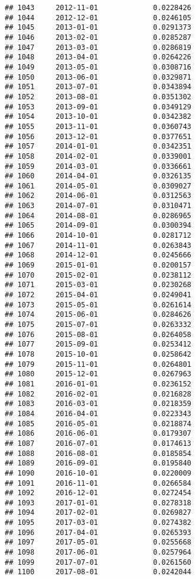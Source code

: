 \documentclass[
]{article}
\begin{document}
\begin{verbatim}
## 1043     2012-11-01             0.0228426
## 1044     2012-12-01             0.0246105
## 1045     2013-01-01             0.0291373
## 1046     2013-02-01             0.0285287
## 1047     2013-03-01             0.0286819
## 1048     2013-04-01             0.0264226
## 1049     2013-05-01             0.0308716
## 1050     2013-06-01             0.0329871
## 1051     2013-07-01             0.0343894
## 1052     2013-08-01             0.0351302
## 1053     2013-09-01             0.0349129
## 1054     2013-10-01             0.0342382
## 1055     2013-11-01             0.0360743
## 1056     2013-12-01             0.0377651
## 1057     2014-01-01             0.0342351
## 1058     2014-02-01             0.0339001
## 1059     2014-03-01             0.0336661
## 1060     2014-04-01             0.0326135
## 1061     2014-05-01             0.0309027
## 1062     2014-06-01             0.0312563
## 1063     2014-07-01             0.0310471
## 1064     2014-08-01             0.0286965
## 1065     2014-09-01             0.0300394
## 1066     2014-10-01             0.0281712
## 1067     2014-11-01             0.0263843
## 1068     2014-12-01             0.0245666
## 1069     2015-01-01             0.0200157
## 1070     2015-02-01             0.0238112
## 1071     2015-03-01             0.0230268
## 1072     2015-04-01             0.0249041
## 1073     2015-05-01             0.0261614
## 1074     2015-06-01             0.0284626
## 1075     2015-07-01             0.0263332
## 1076     2015-08-01             0.0264058
## 1077     2015-09-01             0.0253412
## 1078     2015-10-01             0.0258642
## 1079     2015-11-01             0.0264801
## 1080     2015-12-01             0.0267963
## 1081     2016-01-01             0.0236152
## 1082     2016-02-01             0.0216828
## 1083     2016-03-01             0.0218359
## 1084     2016-04-01             0.0223343
## 1085     2016-05-01             0.0218874
## 1086     2016-06-01             0.0179307
## 1087     2016-07-01             0.0174613
## 1088     2016-08-01             0.0185854
## 1089     2016-09-01             0.0195840
## 1090     2016-10-01             0.0220009
## 1091     2016-11-01             0.0266584
## 1092     2016-12-01             0.0272454
## 1093     2017-01-01             0.0278318
## 1094     2017-02-01             0.0269827
## 1095     2017-03-01             0.0274382
## 1096     2017-04-01             0.0265393
## 1097     2017-05-01             0.0255668
## 1098     2017-06-01             0.0257964
## 1099     2017-07-01             0.0261560
## 1100     2017-08-01             0.0242044

\end{verbatim}
\end{document}
